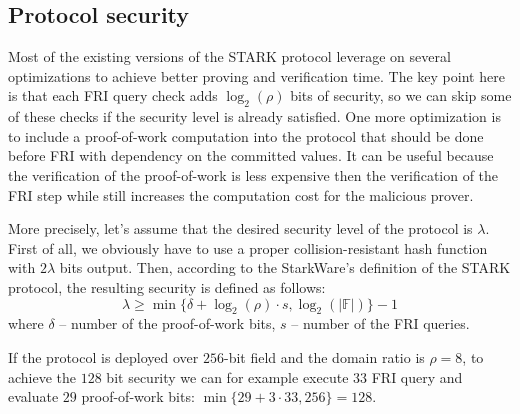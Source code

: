 \documentclass[../lecture-notes.tex]{subfiles}
\begin{document}
\subsection{Protocol security}
Most of the existing versions of the STARK protocol leverage on several
optimizations to achieve better proving and verification time. The key point
here is that each FRI query check adds $\log_2(\rho)$ bits of security, so we can
skip some of these checks if the security level is already satisfied. One more
optimization is to include a proof-of-work computation into the protocol that
should be done before FRI with dependency on the committed values. It can be
useful because the verification of the proof-of-work is less expensive then the
verification of the FRI step while still increases the computation cost for the
malicious prover. 

More precisely, let's assume that the desired security level of the protocol is
$\lambda$. First of all, we obviously have to use a proper collision-resistant
hash function with $2\lambda$ bits output. Then, according to the StarkWare's
definition of the STARK protocol, the resulting security is defined as follows:
\begin{equation*}
    \lambda \geq \min\{ \delta + \log_2(\rho) \cdot s, \log_2(|\mathbb{F}|) \} - 1
\end{equation*}
where $\delta$ -- number of the proof-of-work bits, $s$ -- number of the FRI queries.

\begin{example}
If the protocol is deployed over $256$-bit field and the domain ratio is $\rho =
8$, to achieve the $128$ bit security we can for example execute $33$ FRI query
and evaluate $29$ proof-of-work bits: $\min\{29+3\cdot 33, 256\} = 128$. 
\end{example}
\end{document}

